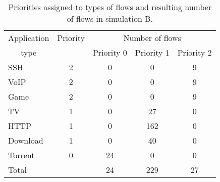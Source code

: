 \begin{table}
	\caption{Priorities assigned to types of flows and resulting number of flows in simulation B.}
	\label{tab:flows_count_B}
	\centering
	
	\begin{tabular}{@{}l|cccc@{}}
		\toprule
		\multicolumn{1}{c|}{Application} & Priority & \multicolumn{3}{c}{Number of flows}   \\
		\multicolumn{1}{c|}{type}        &          & Priority 0 & Priority 1 & Priority 2  \\ \midrule
		SSH                              &    2     &     0      &     0      &     9       \\
		VoIP                             &    2     &     0      &     0      &     9       \\
		Game                             &    2     &     0      &     0      &     9       \\
		TV                               &    1     &     0      &     27     &     0       \\
		HTTP                             &    1     &     0      &    162     &     0       \\
		Download                         &    1     &     0      &     40     &     0       \\
		Torrent                          &    0     &     24     &     0      &     0       \\ \midrule
		Total                            &          &     24     &    229     &     27      \\ \bottomrule
	\end{tabular}
\end{table}